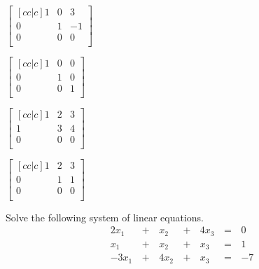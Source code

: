 \documentclass{article}
\begin{document}
\begin{readinessAssuranceTest}
  \begin{multicols}{4}
  \begin{readinessAssuranceTestChoices}
  \item
    \(
      \begin{bmatrix}[cc|c]
        1 & 0 & 3 \\
        0 & 1 & -1 \\
        0 & 0 & 0 \\
      \end{bmatrix}
    \)
  \item
    \(
      \begin{bmatrix}[cc|c]
        1 & 0 & 0 \\
        0 & 1 & 0 \\
        0 & 0 & 1 \\
      \end{bmatrix}
    \) %
  \item
    \(
      \begin{bmatrix}[cc|c]
        1 & 2 & 3 \\
        1 & 3 & 4 \\
        0 & 0 & 0 \\
      \end{bmatrix}
    \)
  \item
    \(
      \begin{bmatrix}[cc|c]
        1 & 2 & 3 \\
        0 & 1 & 1 \\
        0 & 0 & 0 \\
      \end{bmatrix}
    \)
  \end{readinessAssuranceTestChoices}
  \end{multicols}

  \item Solve the following system of linear equations.
  \begin{alignat*}{4}
    2x_1 &\,+\,& x_2 &\,+\,& 4x_3 &\,=\,& 0 \\
     x_1 &\,+\,& x_2 &\,+\,&  x_3 &\,=\,& 1 \\
   -3x_1 &\,+\,& 4x_2 &\,+\,& x_3 &\,=\,& -7 \\
  \end{alignat*}


\end{readinessAssuranceTest}
\end{document}
